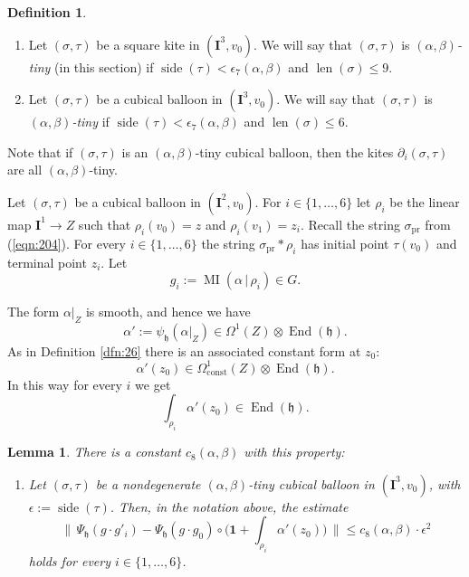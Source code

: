 \documentclass[10pt, a4paper]{amsart}
\newtheorem{lem}[equation]{Lemma}
\theoremstyle{definition}
\newtheorem{dfn}[equation]{Definition}
\numberwithin{equation}{section}
\newcommand{\opn}{\operatorname}
\newcommand{\rmitem}[1]{\item[\text{\textup{(#1)}}]}
\newcommand{\mfrak}[1]{\mathfrak{#1}}
\newcommand{\mbf}[1]{\mathbf{#1}}
\newcommand{\mrm}[1]{\mathrm{#1}}
\newcommand{\bsym}[1]{\boldsymbol{#1}}
\newcommand{\Norm}[1]{\bigl\lVert\, #1 \, \bigr\rVert}
\renewcommand{\vert}{\, | \,}
\newcommand{\h}{\mfrak{h}}
\begin{document}
\begin{dfn}
\begin{enumerate}
\item Let $(\sigma, \tau)$ be a square kite in $(\mbf{I}^3, v_0)$. We
will say that $(\sigma, \tau)$ is
{\em $(\alpha, \beta)$-tiny} (in this section) if 
$\opn{side}(\tau) < \epsilon_7(\alpha, \beta)$ and
$\opn{len}(\sigma) \leq 9$. 
\item Let $(\sigma, \tau)$ be a cubical balloon in $(\mbf{I}^3, v_0)$. We
will say that $(\sigma, \tau)$ is
{\em $(\alpha, \beta)$-tiny} if 
$\opn{side}(\tau) < \epsilon_7(\alpha, \beta)$ and
$\opn{len}(\sigma) \leq 6$. 
\end{enumerate}
\end{dfn}

Note that if $(\sigma, \tau)$ is an $(\alpha, \beta)$-tiny cubical balloon,
then the kites $\partial_i(\sigma, \tau)$ are all $(\alpha, \beta)$-tiny.

Let $(\sigma, \tau)$  be a cubical balloon in $(\mbf{I}^2, v_0)$.
For $i \in \{ 1, \ldots, 6 \}$ let $\rho_i$ be the linear map 
$\mbf{I}^1 \to Z$ such that $\rho_i(v_0) = z$ and 
$\rho_i(v_1) = z_i$. Recall the string $\sigma_{\mrm{pr}}$ from
(\ref{eqn:204}). 
For every $i \in \{ 1, \ldots, 6 \}$ the string
$\sigma_{\mrm{pr}} * \rho_i$ has initial point $\tau(v_0)$ and terminal point
$z_i$.
Let
\[ g_i := \opn{MI}(\alpha \vert \rho_i) \in G . \]

The form $\alpha|_Z$ is smooth, and hence we have
\[ \alpha' := \psi_{\h}(\alpha|_Z) \in 
\Omega^1(Z) \otimes \opn{End}(\h) .  \] 
As in Definition \ref{dfn:26} there is an associated constant form at $z_0$:
\[ \alpha'(z_0) \in \Omega^1_{\mrm{const}}(Z) \otimes \opn{End}(\h) . \]
In this way for every $i$ we get 
\[ \int_{\rho_i} \alpha'(z_0) \in \opn{End}(\h) . \]

\begin{lem} \label{lem:44}
There is a constant $c_8(\alpha, \beta)$ with this property:
\begin{enumerate}
\rmitem{$*$} Let $(\sigma, \tau)$ be a nondegenerate $(\alpha, \beta)$-tiny 
cubical balloon in $(\mbf{I}^3, v_0)$,
with $\epsilon := \opn{side}(\tau)$. 
Then, in the notation above, the estimate
\[ \Norm{ \Psi_{\h}(g \cdot g'_i) - 
\Psi_{\h}(g \cdot g_0) \circ 
\bigl( \bsym{1} + \int_{\rho_i} \alpha'(z_0) \bigr) }
\leq c_8(\alpha, \beta) \cdot \epsilon^2  \]
holds for every $i \in \{ 1, \ldots, 6 \}$.
\end{enumerate}
\end{lem}
\end{document}
